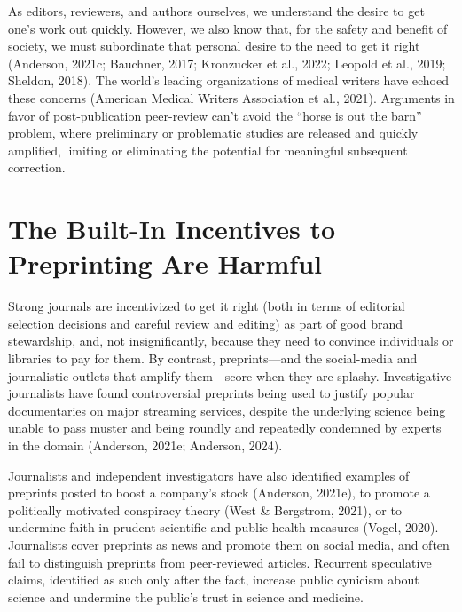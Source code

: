 \documentclass[authordate, perspective, issue]{jote-new-article}
\begin{document}
	As editors, reviewers, and authors ourselves, we understand the desire to get one's work out quickly. However, we also know that, for the safety and benefit of society, we must subordinate that personal desire to the need to get it right (Anderson, 2021c; Bauchner, 2017; Kronzucker et al., 2022; Leopold et al., 2019; Sheldon, 2018). The world's leading organizations of medical writers have echoed these concerns (American Medical Writers Association et al., 2021). Arguments in favor of post-publication peer-review can't avoid the “horse is out the barn” problem, where preliminary or problematic studies are released and quickly amplified, limiting or eliminating the potential for meaningful subsequent correction.







	\section{The Built-In Incentives to Preprinting Are Harmful}







	Strong journals are incentivized to get it right (both in terms of editorial selection decisions and careful review and editing) as part of good brand stewardship, and, not insignificantly, because they need to convince individuals or libraries to pay for them. By contrast, preprints—and the social-media and journalistic outlets that amplify them—score when they are splashy. Investigative journalists have found controversial preprints being used to justify popular documentaries on major streaming services, despite the underlying science being unable to pass muster and being roundly and repeatedly condemned by experts in the domain (Anderson, 2021e; Anderson, 2024).







	Journalists and independent investigators have also identified examples of preprints posted to boost a company's stock (Anderson, 2021e), to promote a politically motivated conspiracy theory (West \& Bergstrom, 2021), or to undermine faith in prudent scientific and public health measures (Vogel, 2020). Journalists cover preprints as news and promote them on social media, and often fail to distinguish preprints from peer-reviewed articles. Recurrent speculative claims, identified as such only after the fact, increase public cynicism about science and undermine the public's trust in science and medicine.
\end{document}

